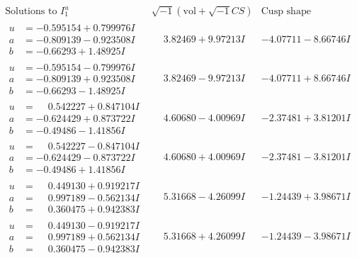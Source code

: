 \documentclass[1p]{elsarticle_modified}
\theoremstyle{definition}
\newcommand{\I}{\sqrt{-1}}
\begin{document}
$$\begin{array}{c|c|c}  
\text{Solutions to }I^u_{1}& \I (\text{vol} + \sqrt{-1}CS) & \text{Cusp shape}\\
 \hline 
\begin{aligned}
u &= -0.595154 + 0.799976 I \\
a &= -0.809139 - 0.923508 I \\
b &= -0.66293 + 1.48925 I\end{aligned}
 & \phantom{-}3.82469 + 9.97213 I & -4.07711 - 8.66746 I \\ \hline\begin{aligned}
u &= -0.595154 - 0.799976 I \\
a &= -0.809139 + 0.923508 I \\
b &= -0.66293 - 1.48925 I\end{aligned}
 & \phantom{-}3.82469 - 9.97213 I & -4.07711 + 8.66746 I \\ \hline\begin{aligned}
u &= \phantom{-}0.542227 + 0.847104 I \\
a &= -0.624429 + 0.873722 I \\
b &= -0.49486 - 1.41856 I\end{aligned}
 & \phantom{-}4.60680 - 4.00969 I & -2.37481 + 3.81201 I \\ \hline\begin{aligned}
u &= \phantom{-}0.542227 - 0.847104 I \\
a &= -0.624429 - 0.873722 I \\
b &= -0.49486 + 1.41856 I\end{aligned}
 & \phantom{-}4.60680 + 4.00969 I & -2.37481 - 3.81201 I \\ \hline\begin{aligned}
u &= \phantom{-}0.449130 + 0.919217 I \\
a &= \phantom{-}0.997189 - 0.562134 I \\
b &= \phantom{-}0.360475 + 0.942383 I\end{aligned}
 & \phantom{-}5.31668 - 4.26099 I & -1.24439 + 3.98671 I \\ \hline\begin{aligned}
u &= \phantom{-}0.449130 - 0.919217 I \\
a &= \phantom{-}0.997189 + 0.562134 I \\
b &= \phantom{-}0.360475 - 0.942383 I\end{aligned}
 & \phantom{-}5.31668 + 4.26099 I & -1.24439 - 3.98671 I \\ \hline\begin{aligned}

\end{aligned}
\end{array}$$
\end{document}
